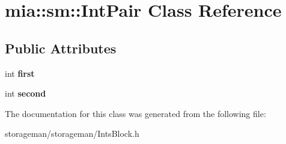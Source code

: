 \hypertarget{classmia_1_1sm_1_1_int_pair}{\section{mia\-:\-:sm\-:\-:Int\-Pair Class Reference}
\label{classmia_1_1sm_1_1_int_pair}
}
\subsection*{Public Attributes}
\begin{DoxyCompactItemize}
\item 
\hypertarget{classmia_1_1sm_1_1_int_pair_a6b26fd35105cf8003c149fc7bb291d77}{int {\bfseries first}}\label{classmia_1_1sm_1_1_int_pair_a6b26fd35105cf8003c149fc7bb291d77}

\item 
\hypertarget{classmia_1_1sm_1_1_int_pair_ac7ddf6cbe2480340524e6c7264be4253}{int {\bfseries second}}\label{classmia_1_1sm_1_1_int_pair_ac7ddf6cbe2480340524e6c7264be4253}

\end{DoxyCompactItemize}


The documentation for this class was generated from the following file\-:\begin{DoxyCompactItemize}
\item 
storageman/storageman/Ints\-Block.\-h\end{DoxyCompactItemize}
